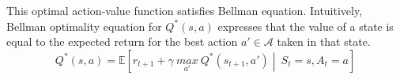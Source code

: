 This optimal action-value function satisfies Bellman equation. Intuitively, Bellman optimality equation for \(Q^{*}(s, a)\) expresses that the value of a state is equal to the expected return for the best action \(a' \in \mathcal{A}\) taken in that state.
\begin{equation}
    Q^{*}(s, a) = \mathbb{E} \left[ r_{t+1} + \gamma\ \underset{a'}{max}\ Q^{*}(s_{t+1}, a') \middle\vert\ S_{t}{=}s, A_{t}{=}a  \right]
\end{equation}

